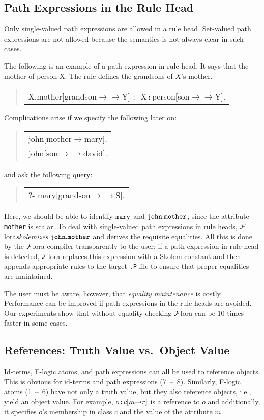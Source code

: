 \documentclass[11pt]{article}
\newenvironment{qrules}{\begin{quote}\sf\begin{tabular}[t]{l}}%
{\end{tabular}\end{quote}}
\newcommand{\isa}{\,{\bf{:}}\,}
\newcommand{\fd}{\ensuremath{{\rightarrow}}}                   %
\newcommand{\mvd}{\ensuremath{{\rightarrow\!\!\!\!\rightarrow}}}  %
\newcommand{\FLORA}{{\mbox{${\cal F}${\sc lora}}}\xspace}
\begin{document}
\subsection{Path Expressions in the Rule Head}

Only single-valued path expressions are allowed in a rule head. Set-valued
path expressions are not allowed because the semantics is not always clear
in such cases.

The following is an example of a path expression in rule head. It says
that the mother of person X. The rule defines the grandsons of $X$'s
mother.
\begin{qrules}
X.mother[grandson{\mvd}Y] :- X{\isa}person[son{\mvd}Y].
\end{qrules}
Complications arise if we specify the following later on:
\begin{qrules}
john[mother{\fd}mary]. \\
john[son{\mvd}david].
\end{qrules}
and ask the following query:
\begin{qrules}
?- mary[grandson{\mvd}S].
\end{qrules}

Here, we should be able to identify ${\tt mary}$ and ${\tt john.mother}$,
since the attribute {\tt mother} is scalar. To deal with single-valued path
expressions in rule heads, \FLORA \emph{skolemizes} ${\tt john.mother}$ and
derives the requisite equalities.  All this is done by the
\FLORA compiler transparently to the user: if a path expression in rule head
is detected, \FLORA replaces this expression with a Skolem constant and
then appends appropriate rules to the target {\tt .P} file to ensure that
proper equalities are maintained.

The user must be aware, however, that \emph{equality maintenance} is costly.
Performance can be improved if path expressions in the rule heads are
avoided.  Our experiments show that without equality checking \FLORA can be
10 times faster in some cases.


\subsection{References: Truth Value vs.\ Object Value}\label{sec-references}

Id-terms, F-logic atoms, and path expressions can all be used to
reference objects. This is obvious for id-terms and path
expressions (7~--~8). Similarly, F-logic atoms (1~--~6) have not only a
truth value, but they also reference objects, i.e., yield an object value.
For example, $o\isa c[m\fd r]$ is a reference to $o$ and additionally,
it specifies $o$'s membership in class $c$ and the value of the attribute $m$.
\end{document}
